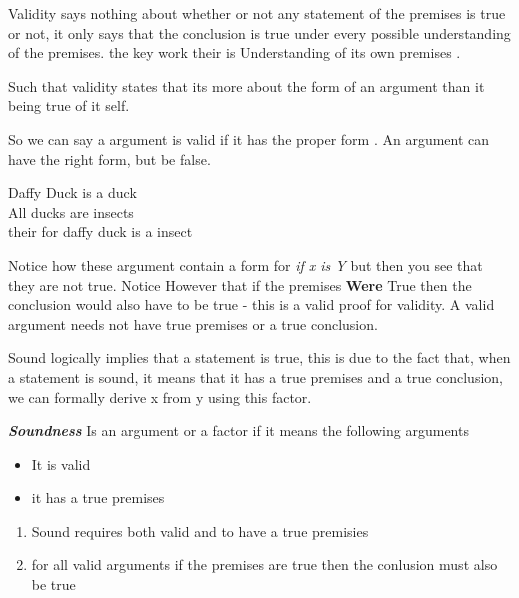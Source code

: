 \documentclass{article}
\theoremstyle{mytheoremstyle}
\theoremstyle{mytheoremstyle}
\theoremstyle{myproblemstyle}
\begin{document}
\begin{theorem}
	Validity says nothing about whether or not any statement of the premises is true or not, it only says that the conclusion is true under every possible understanding of the premises.
	the key work their is Understanding of its own premises .

	Such that validity states that its more about the form of an argument than it being true of it self.
\end{theorem}

So we can say a argument is valid if it has the proper form . An argument can have the right form, but be false.
\\
\begin{tt}
	Daffy Duck is a duck \\
	All ducks are insects \\
	their for daffy duck is a insect \\
\end{tt}

Notice how these argument contain a form for \textit{if x is Y} but then you see that they are not true.
Notice However that if the premises \textbf{Were} True then the conclusion would also have to be true - this is a valid proof for validity. A valid argument needs not have true premises or a true conclusion.

\begin{theorem}
	Sound logically implies that a statement is true, this is due to the fact that, when a statement is sound, it means that it has a true premises and a true conclusion, we can formally derive x from y using this factor.

	\textbf{\textit{Soundness}} Is an argument or a factor if it means the following arguments

	\begin{itemize}
		\item It is valid
		\item it has a true premises
	\end{itemize}
\end{theorem}

\begin{enumerate}
	\item  Sound requires both valid and to have a true premisies
	\item for all valid arguments if the premises are true then the conlusion must also be true
\end{enumerate}
\end{document}

